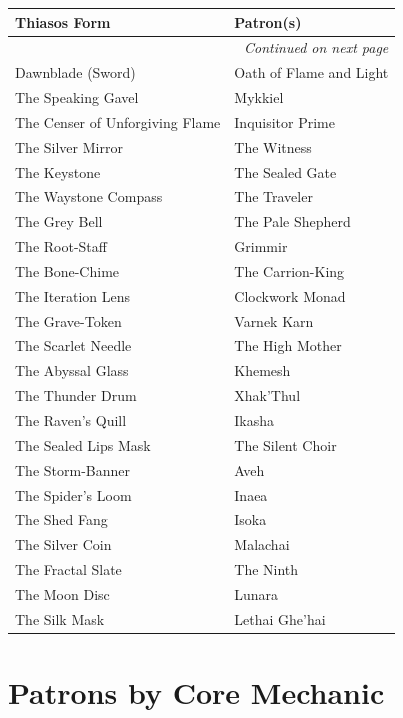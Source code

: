 \begin{longtable}{|p{5cm}|p{11cm}|}
\hline
\textbf{Thiasos Form} & \textbf{Patron(s)} \\
\hline
\endhead
\hline
\multicolumn{2}{|r|}{\textit{Continued on next page}} \\
\endfoot
\hline
\endlastfoot
Dawnblade (Sword) & Oath of Flame and Light \\
The Speaking Gavel & Mykkiel \\
The Censer of Unforgiving Flame & Inquisitor Prime \\
The Silver Mirror & The Witness \\
The Keystone & The Sealed Gate \\
The Waystone Compass & The Traveler \\
The Grey Bell & The Pale Shepherd \\
The Root-Staff & Grimmir \\
The Bone-Chime & The Carrion-King \\
The Iteration Lens & Clockwork Monad \\
The Grave-Token & Varnek Karn \\
The Scarlet Needle & The High Mother \\
The Abyssal Glass & Khemesh \\
The Thunder Drum & Xhak'Thul \\
The Raven's Quill & Ikasha \\
The Sealed Lips Mask & The Silent Choir \\
The Storm-Banner & Aveh \\
The Spider's Loom & Inaea \\
The Shed Fang & Isoka \\
The Silver Coin & Malachai \\
The Fractal Slate & The Ninth \\
The Moon Disc & Lunara \\
The Silk Mask & Lethai Ghe'hai \\
\hline
\end{longtable}

\section{Patrons by Core Mechanic}

